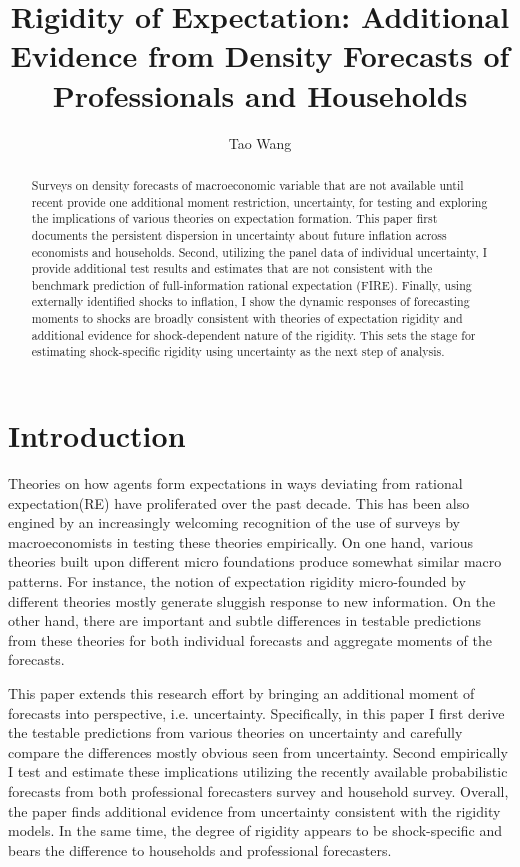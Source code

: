 \documentclass[]{article}
\title{Rigidity of Expectation: Additional Evidence from Density Forecasts of Professionals and Households}
\author{Tao Wang}
\begin{document}
	
	\maketitle
	
	\begin{abstract}
		Surveys on density forecasts of macroeconomic variable that are not available until recent provide one additional moment restriction, uncertainty, for testing and exploring the implications of various theories on expectation formation. This paper first documents the persistent dispersion in uncertainty about future inflation across economists and households. Second,  utilizing the panel data of individual uncertainty, I provide additional test results and estimates that are not consistent with the benchmark prediction of full-information rational expectation (FIRE). Finally, using externally identified shocks to inflation, I show the dynamic responses of forecasting moments to shocks are broadly consistent with theories of expectation rigidity and additional evidence for shock-dependent nature of the rigidity.  This sets the stage for estimating shock-specific rigidity using uncertainty as the next step of analysis.  
		
	\end{abstract}
	
	\newpage 
	
	\section{Introduction}
	
	
	Theories on how agents form expectations in ways deviating from rational expectation(RE) have proliferated over the past decade. This has been also engined by an increasingly welcoming recognition of the use of surveys by macroeconomists in testing these theories empirically.  On one hand, various theories built upon different micro foundations produce somewhat similar macro patterns. For instance, the notion of expectation rigidity micro-founded by different theories mostly generate sluggish response to new information.  On the other hand, there are important and subtle differences in testable predictions from these theories for both individual forecasts and aggregate moments of the forecasts. 
	
	This paper extends this research effort by bringing an additional moment of forecasts into perspective, i.e. uncertainty. Specifically, in this paper I first derive the testable predictions from various theories on uncertainty and carefully compare the differences mostly obvious seen from uncertainty. Second empirically I test and estimate these implications utilizing the recently available probabilistic forecasts from both professional forecasters survey and household survey. Overall, the paper finds additional evidence from uncertainty consistent with the rigidity models. In the same time, the degree of rigidity appears to be shock-specific and bears the difference to households and professional forecasters. 
	
\end{document}
